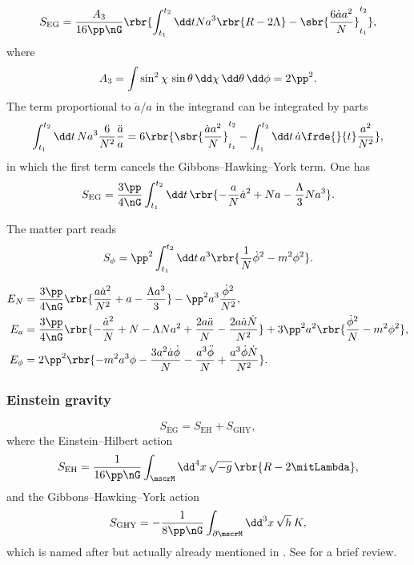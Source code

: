 \documentclass[a4paper,11pt]{article}
\begin{document}
\begin{equation}
S_\text{EG} = \frac{A_3}{16\pp\nG} \rbr{\int_{t_1}^{t_2} \dd t
Na^3\rbr{R - 2\Lambda} - \sbr{\frac{6\dot{a}a^2}{N}}_{t_1}^{t_2}},
\end{equation}
where
\begin{equation}
A_3 = \int \sin^2\chi\,\sin\theta\,\dd\chi\,\dd\theta\,\dd\phi = 2\pp^2.
\end{equation}
The term proportional to $\ddot{a}/a$ in the integrand can be integrated by
parts
\begin{equation}
\int_{t_1}^{t_2} \dd t\,Na^3 \frac{6}{N^2} \frac{\ddot{a}}{a}
= 6\rbr{\sbr{\frac{\dot{a}a^2}{N}}_{t_1}^{t_2} - \int_{t_1}^{t_2}\dd t
\,\dot{a}\frde{}{t}\frac{a^2}{N^2}},
\end{equation}
in which the first term cancels the Gibbons--Hawking--York term. One has
\begin{equation}
S_\text{EG} = \frac{3\pp}{4\nG}\int_{t_1}^{t_2} \dd t\,
\rbr{-\frac{a}{N}\dot{a}^2 + N a - \frac{\Lambda}{3}N a^3}.
\end{equation}

The matter part reads
\begin{equation}
S_\phi = \pp^2 \int_{t_1}^{t_2}\dd t\,
a^3 \rbr{\frac{1}{N}\dot{\phi}^2 - m^2\phi^2}.
\end{equation}

\begin{align}
E_N &= \frac{3\pp}{4\nG}\rbr{\frac{a\dot{a}^2}{N^2}+a-\frac{\Lambda a^3}{3}}
-\pp^2 a^3 \frac{\dot{\phi}^2}{N^2} ,\\
E_a &= \frac{3\pp}{4\nG}\rbr{-\frac{\dot{a}^2}{N}+N-\Lambda Na^2
+\frac{2a\ddot{a}}{N} - \frac{2a\dot{a}\dot{N}}{N^2}}
+3\pp^2a^2\rbr{\frac{\dot{\phi}^2}{N} - m^2\phi^2},\\
E_\phi &= 2\pp^2 \rbr{-m^2 a^3 \phi - \frac{3 a^2 \dot{a}\dot{\phi}}{N}
-\frac{a^3\ddot{\phi}}{N} + \frac{a^3\dot{\phi}\dot{N}}{N^2}}.
\end{align}


\subsubsection{Einstein gravity}

\begin{equation}
S_\text{EG} = S_\text{EH} + S_\text{GHY},
\label{eq:action-einstein-gravity}
\end{equation}
where the Einstein--Hilbert action
\begin{equation}
S_\text{EH} = \frac{1}{16\pp\nG}\int_\mscrM\dd^4 x\,\sqrt{-g}\, 
\rbr{R-2\mitLambda},
\end{equation}
and the Gibbons--Hawking--York action
\begin{equation}
S_\text{GHY} = -\frac{1}{8\pp\nG}\int_{\partial\mscrM}\dd^3 x\,\sqrt{h}\, K,
\end{equation}
which is named after \cite{Gibbons1977,York1972} but actually already
mentioned in \cite{Einstein1916}. See \cite{Dyer2009} for a brief review.



\printbibliography
\end{document}
